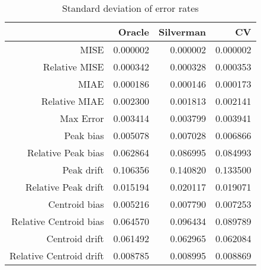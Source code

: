 \begin{table}[ht]
\centering
\begin{tabular}{rrrr}
  \hline
 & Oracle & Silverman & CV \\ 
  \hline
MISE & 0.000002 & 0.000002 & 0.000002 \\ 
  Relative MISE & 0.000342 & 0.000328 & 0.000353 \\ 
  MIAE & 0.000186 & 0.000146 & 0.000173 \\ 
  Relative MIAE & 0.002300 & 0.001813 & 0.002141 \\ 
  Max Error & 0.003414 & 0.003799 & 0.003941 \\ 
  Peak bias & 0.005078 & 0.007028 & 0.006866 \\ 
  Relative Peak bias & 0.062864 & 0.086995 & 0.084993 \\ 
  Peak drift & 0.106356 & 0.140820 & 0.133500 \\ 
  Relative Peak drift & 0.015194 & 0.020117 & 0.019071 \\ 
  Centroid bias & 0.005216 & 0.007790 & 0.007253 \\ 
  Relative Centroid bias & 0.064570 & 0.096434 & 0.089789 \\ 
  Centroid drift & 0.061492 & 0.062965 & 0.062084 \\ 
  Relative Centroid drift & 0.008785 & 0.008995 & 0.008869 \\ 
   \hline
\end{tabular}
\caption{Standard deviation of error rates} 
\label{tbl:stddev_error_rates}
\end{table}
